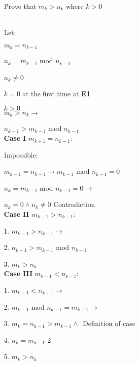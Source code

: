 \documentclass{article}
\begin{document}
Prove that $m_{k} > n_{k}$ where $k > 0$\\\

Let:\

\hspace{1cm} $m_{k} = n_{k - 1}$

\hspace{1cm} $n_{k} = m_{k - 1}$ mod $n_{k - 1}$\

\hspace{1cm} $n_{k} \neq 0$\ 

\hspace{1cm} $k = 0$ at the first time at \textbf{E1}\

\hspace{1cm} $k > 0$\\


$m_{k} > n_{k} \rightarrow$

$n_{k-1} > m_{k-1}$ mod $n_{k-1}$\\

\textbf{Case I} $m_{k - 1} = n_{k - 1}$:\

\hspace{1cm} Impossible:

\hspace{1cm} $m_{k - 1} = n_{k - 1} \rightarrow m_{k - 1}$ mod $n_{k - 1} = 0$\

\hspace{1cm} $n_{k} = m_{k - 1}$ mod $n_{k - 1} = 0 \rightarrow$\

\hspace{1cm} $n_{k} = 0 \wedge n_{k} \neq 0$ \hfill Contradiction\\

\textbf{Case II} $m_{k - 1} > n_{k - 1}$:\

\hspace{1cm} 1. $m_{k - 1} > n_{k - 1} \rightarrow$\

\hspace{1cm} 2. $n_{k-1} > m_{k - 1}$ mod $n_{k - 1}$\

\hspace{1cm} 3. $m_{k} > n_{k}$\\


\textbf{Case III} $m_{k - 1} < n_{k - 1}$:\

\hspace{1cm} 1. $m_{k - 1} < n_{k - 1} \rightarrow$\

\hspace{1cm} 2. $m_{k - 1}$ mod $n_{k - 1} = m_{k - 1} \rightarrow$\

\hspace{1cm} 3. $m_{k} = n_{k - 1}> m_{k - 1} \wedge$\ \hfill Definition of case

\hspace{1cm} 4. $n_{k} = m_{k - 1}$ \hfill 2

\hspace{1cm} 5. $m_{k} > n_{k}$
\end{document}
